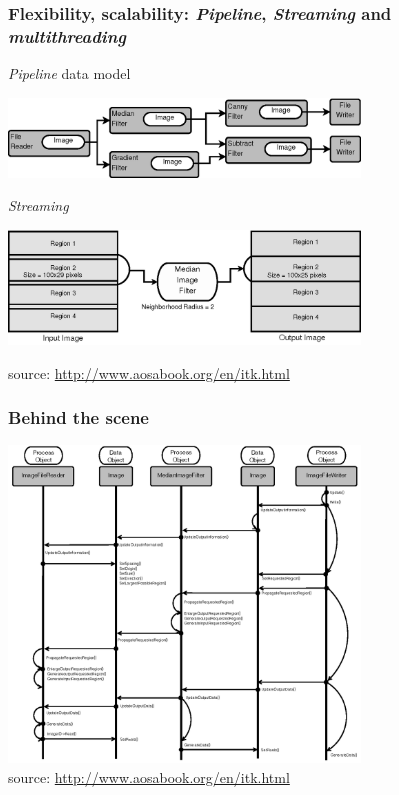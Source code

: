 \documentclass[8pt]{beamer}
\begin{document}
\begin{frame}
\frametitle{Flexibility, scalability: \textit{Pipeline}, \textit{Streaming} and \textit{multithreading}}

\begin{block}{\textit{Pipeline} data model}
\begin{center}
\includegraphics[width=0.7\textwidth]{images/ProcessObjectDataObject.png}
\end{center}
\end{block}
\vspace{-0.5cm}
\begin{block}{\textit{Streaming}}
\begin{center}
\includegraphics[width=0.7\textwidth]{images/StreamingImageDiagram.png}
\end{center}
\end{block}
\vspace{-0.5cm}
\begin{center}
\tiny{source: \url{http://www.aosabook.org/en/itk.html}}
\end{center}
\end{frame}

\begin{frame}
\frametitle{Behind the scene}
\begin{center}
\includegraphics[width=0.7\textwidth]{images/ProcessObjectDataObjectInteractionUML.png}\\
\tiny{source: \url{http://www.aosabook.org/en/itk.html}}
\end{center}
\end{frame}
\end{document}
